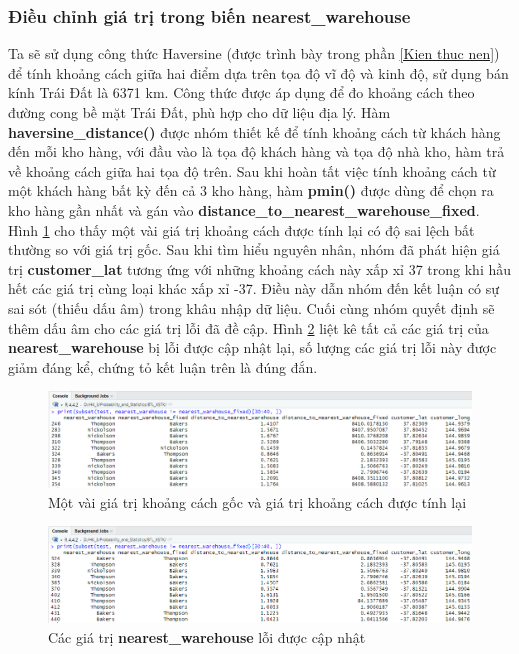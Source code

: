 \subsubsection{Điều chỉnh giá trị trong biến nearest\_warehouse}
Ta sẽ sử dụng công thức Haversine (được trình bày trong phần \ref{Kien thuc nen}) để tính khoảng cách giữa hai điểm dựa trên tọa độ vĩ độ và kinh độ, sử dụng bán kính Trái Đất là 6371 km. Công thức được áp dụng để đo khoảng cách theo đường cong bề mặt Trái Đất, phù hợp cho dữ liệu địa lý. Hàm \textbf{haversine\_distance()} được nhóm thiết kế để tính khoảng cách từ khách hàng đến mỗi kho hàng, với đầu vào là tọa độ khách hàng và tọa độ nhà kho, hàm trả về khoảng cách giữa hai tọa độ trên. Sau khi hoàn tất việc tính khoảng cách từ một khách hàng bất kỳ đến cả 3 kho hàng, hàm \textbf{pmin()} được dùng để chọn ra kho hàng gần nhất và gán vào \textbf{distance\_to\_nearest\_warehouse\_fixed}. Hình \ref{f6} cho thấy một vài giá trị khoảng cách được tính lại có độ sai lệch bất thường so với giá trị gốc. Sau khi tìm hiểu nguyên nhân, nhóm đã phát hiện giá trị \textbf{customer\_lat} tương ứng với những khoảng cách này xấp xỉ 37 trong khi hầu hết các giá trị cùng loại khác xấp xỉ -37. Điều này dẫn nhóm đến kết luận có sự sai sót (thiếu dấu âm) trong khâu nhập dữ liệu. Cuối cùng nhóm quyết định sẽ thêm dấu âm cho các giá trị lỗi đã đề cập. Hình \ref{f7} liệt kê tất cả các giá trị của \textbf{nearest\_warehouse} bị lỗi được cập nhật lại, số lượng các giá trị lỗi này được giảm đáng kể, chứng tỏ kết luận trên là đúng đắn.
\begin{figure}[!htbp]
    \centering
    \includegraphics[width=\textwidth]{graphics/Pre_processing_data/f6.PNG}
    \caption{Một vài giá trị khoảng cách gốc và giá trị khoảng cách được tính lại}
    \label{f6}
\end{figure}
\begin{figure}[!htbp]
    \centering
    \includegraphics[width=\textwidth]{graphics/Pre_processing_data/f7.PNG}
    \caption{Các giá trị \textbf{nearest\_warehouse} lỗi được cập nhật}
    \label{f7}
\end{figure}